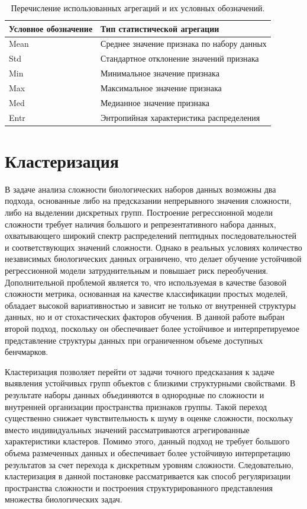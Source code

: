 \documentclass[specification,annotation,times]{itmo-student-thesis}
\begin{document}
\begin{table}[h]
\centering
\begin{tabular}{|l|l|}
\hline
\textbf{Условное обозначение} & \textbf{Тип статистической агрегации} \\ \hline
Mean & Среднее значение признака по набору данных \\ \hline
Std & Стандартное отклонение значений признака \\ \hline
Min & Минимальное значение признака \\ \hline
Max & Максимальное значение признака \\ \hline
Med & Медианное значение признака \\ \hline
Entr & Энтропийная характеристика распределения \\ \hline
\end{tabular}
\caption{Перечисление использованных агрегаций и их условных обозначений.}
\label{tab:aggregation_notation}
\end{table}


\section{Кластеризация}

В задаче анализа сложности биологических наборов данных возможны два подхода, основанные либо на предсказании непрерывного значения сложности, либо на выделении дискретных групп. 
Построение регрессионной модели сложности требует наличия большого и репрезентативного набора данных, охватывающего широкий спектр распределений пептидных последовательностей и соответствующих значений сложности. Однако в реальных условиях количество независимых биологических данных ограничено, что делает обучение устойчивой регрессионной модели затруднительным и повышает риск переобучения. Дополнительной проблемой является то, что используемая в качестве базовой сложности метрика, основанная на качестве классификации простых моделей, обладает высокой вариативностью и зависит не только от внутренней структуры данных, но и от стохастических факторов обучения.
В данной работе выбран второй подход, поскольку он обеспечивает более устойчивое и интерпретируемое представление структуры данных при ограниченном объеме доступных бенчмарков.

Кластеризация позволяет перейти от задачи точного предсказания к задаче выявления устойчивых групп объектов с близкими структурными свойствами. В результате наборы данных объединяются в однородные по сложности и внутренней организации пространства признаков группы. Такой переход существенно снижает чувствительность к шуму в оценке сложности, поскольку вместо индивидуальных значений рассматриваются агрегированные характеристики кластеров. Помимо этого, данный подход не требует большого объема размеченных данных и обеспечивает более устойчивую интерпретацию результатов за счет перехода к дискретным уровням сложности. Следовательно, кластеризация в данной постановке рассматривается как способ регуляризации пространства сложности и построения структурированного представления множества биологических задач.
\end{document}
